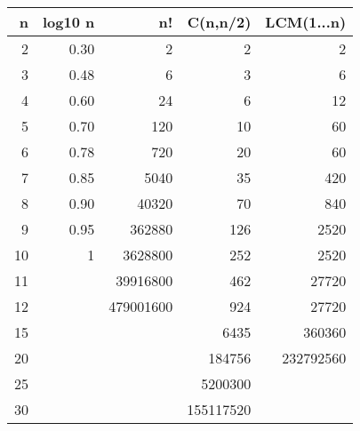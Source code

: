 \begin{small}
\begin{table}[H]
	\centering
	\begin{tabular}{|r|r|r|r|r|}
		\hline
		n & log10 n & n! & C(n,n/2) & LCM(1...n)\\
		\hline
		2 & 0.30 & 2 & 2 & 2\\
		\hline
		3 & 0.48 & 6 & 3 & 6\\
		\hline
		4 & 0.60 & 24 & 6 & 12\\
		\hline
		5 & 0.70 & 120 & 10 & 60 \\
		\hline
		6 & 0.78 & 720 & 20 & 60 \\
		\hline
		7 & 0.85 & 5040 & 35 & 420 \\
		\hline
		8 & 0.90 & 40320 & 70 & 840\\
		\hline
		9 & 0.95 & 362880 & 126 & 2520\\
		\hline
		10 & 1 & 3628800 & 252  & 2520\\
		\hline
		11 &  & 39916800 & 462  & 27720 \\
		\hline
		12 &  & 479001600 & 924 & 27720\\
		\hline
		15 &  &  & 6435 & 360360\\
		\hline
		20 &  &  & 184756 & 232792560\\
		\hline
		25 &  &  & 5200300 & \\
		\hline
		30 &  &  & 155117520 & \\
		\hline
		\end{tabular}
\begin{comment}
		\begin{tabular}{|r|r|r|r|}
			\hline
			n  & LCM(1...n)  & Pn  & Bn \\
			\hline
			2  & 2  & 2  & 2 \\
			\hline
			3  & 6  & 3  & 5 \\
			\hline
			4  & 12  & 5  & 15 \\
			\hline
			5  & 60  & 7  & 52 \\
			\hline
			6  & 60  & 11  & 203 \\
			\hline
			7  & 420  & 15  & 877 \\
			\hline
			8  & 840  & 22  & 4140 \\
			\hline
			9  & 2520  & 30  & 21147 \\
			\hline
			10  & 2520  & 42  & 115975 \\
			\hline
			11  & 27720  & 56  & 678570 \\
			\hline
			12  & 27720  & 77  & 4213597 \\

\end{comment}
\end{table}
\end{small}
